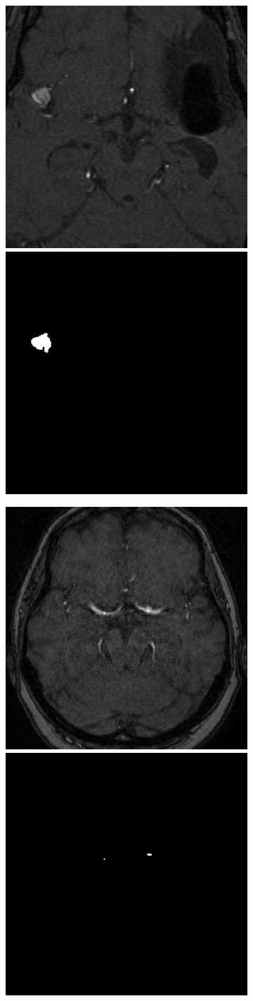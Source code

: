 \begin{figure}
	\centering
	\begin{subfigure}{0.9\linewidth}
		\includegraphics[width=0.5\linewidth]{figures/tof-aneu-max.png}
		\includegraphics[width=0.5\linewidth]{figures/aneu-max.png}
	\end{subfigure}
	\begin{subfigure}{0.9\linewidth}
		\includegraphics[width=0.5\linewidth]{figures/tof-aneu-min.png}
		\includegraphics[width=0.5\linewidth]{figures/aneu-min.png}

\end{subfigure}
\end{figure}
